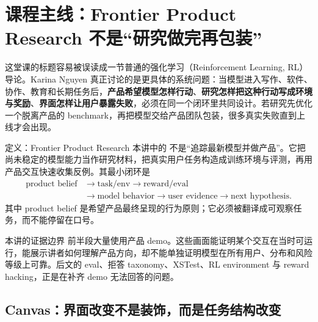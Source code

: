 \section{课程主线：Frontier Product Research 不是“研究做完再包装”}

这堂课的标题容易被误读成一节普通的强化学习（Reinforcement Learning, RL）导论。Karina Nguyen 真正讨论的是更具体的系统问题：当模型进入写作、软件、协作、教育和长期任务后，\textbf{产品希望模型怎样行动}、\textbf{研究怎样把这种行动写成环境与奖励}、\textbf{界面怎样让用户暴露失败}，必须在同一个闭环里共同设计。若研究先优化一个脱离产品的 benchmark，再把模型交给产品团队包装，很多真实失败直到上线才会出现。



\begin{importantbox}{定义：Frontier Product Research}
本讲中的  不是“追踪最新模型并做产品”。它把尚未稳定的模型能力当作研究材料，把真实用户任务构造成训练环境与评测，再用产品交互快速收集反例。其最小闭环是
\[
\begin{aligned}
\text{product belief}&\rightarrow \text{task/env}\rightarrow \text{reward/eval}\\
&\rightarrow \text{model behavior}\rightarrow \text{user evidence}\rightarrow \text{next hypothesis}.
\end{aligned}
\]
其中 product belief 是希望产品最终呈现的行为原则；它必须被翻译成可观察任务，而不能停留在口号。
\end{importantbox}

\begin{knowledgebox}{本讲的证据边界}
前半段大量使用产品 demo。这些画面能证明某个交互在当时可运行，能展示讲者如何理解产品方向，却不能单独证明模型在所有用户、分布和风险等级上可靠。后文的 eval、拒答 taxonomy、XSTest、RL environment 与 reward hacking，正是在补齐 demo 无法回答的问题。
\end{knowledgebox}

\subsection{Canvas：界面改变不是装饰，而是任务结构改变}


